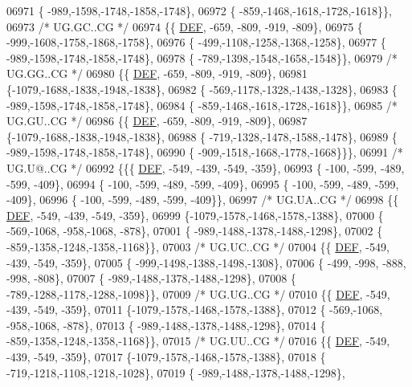 \begin{DoxyCode}
06971 \{ -989,-1598,-1748,-1858,-1748\},
06972 \{ -859,-1468,-1618,-1728,-1618\}\},
06973 \textcolor{comment}{/* UG.GC..CG */}
06974 \{\{  \mbox{\hyperlink{1_88_84__epars_8h_a397419fc12b37ed479c8abb9d444d843}{DEF}}, -659, -809, -919, -809\},
06975 \{ -999,-1608,-1758,-1868,-1758\},
06976 \{ -499,-1108,-1258,-1368,-1258\},
06977 \{ -989,-1598,-1748,-1858,-1748\},
06978 \{ -789,-1398,-1548,-1658,-1548\}\},
06979 \textcolor{comment}{/* UG.GG..CG */}
06980 \{\{  \mbox{\hyperlink{1_88_84__epars_8h_a397419fc12b37ed479c8abb9d444d843}{DEF}}, -659, -809, -919, -809\},
06981 \{-1079,-1688,-1838,-1948,-1838\},
06982 \{ -569,-1178,-1328,-1438,-1328\},
06983 \{ -989,-1598,-1748,-1858,-1748\},
06984 \{ -859,-1468,-1618,-1728,-1618\}\},
06985 \textcolor{comment}{/* UG.GU..CG */}
06986 \{\{  \mbox{\hyperlink{1_88_84__epars_8h_a397419fc12b37ed479c8abb9d444d843}{DEF}}, -659, -809, -919, -809\},
06987 \{-1079,-1688,-1838,-1948,-1838\},
06988 \{ -719,-1328,-1478,-1588,-1478\},
06989 \{ -989,-1598,-1748,-1858,-1748\},
06990 \{ -909,-1518,-1668,-1778,-1668\}\}\},
06991 \textcolor{comment}{/* UG.U@..CG */}
06992 \{\{\{  \mbox{\hyperlink{1_88_84__epars_8h_a397419fc12b37ed479c8abb9d444d843}{DEF}}, -549, -439, -549, -359\},
06993 \{ -100, -599, -489, -599, -409\},
06994 \{ -100, -599, -489, -599, -409\},
06995 \{ -100, -599, -489, -599, -409\},
06996 \{ -100, -599, -489, -599, -409\}\},
06997 \textcolor{comment}{/* UG.UA..CG */}
06998 \{\{  \mbox{\hyperlink{1_88_84__epars_8h_a397419fc12b37ed479c8abb9d444d843}{DEF}}, -549, -439, -549, -359\},
06999 \{-1079,-1578,-1468,-1578,-1388\},
07000 \{ -569,-1068, -958,-1068, -878\},
07001 \{ -989,-1488,-1378,-1488,-1298\},
07002 \{ -859,-1358,-1248,-1358,-1168\}\},
07003 \textcolor{comment}{/* UG.UC..CG */}
07004 \{\{  \mbox{\hyperlink{1_88_84__epars_8h_a397419fc12b37ed479c8abb9d444d843}{DEF}}, -549, -439, -549, -359\},
07005 \{ -999,-1498,-1388,-1498,-1308\},
07006 \{ -499, -998, -888, -998, -808\},
07007 \{ -989,-1488,-1378,-1488,-1298\},
07008 \{ -789,-1288,-1178,-1288,-1098\}\},
07009 \textcolor{comment}{/* UG.UG..CG */}
07010 \{\{  \mbox{\hyperlink{1_88_84__epars_8h_a397419fc12b37ed479c8abb9d444d843}{DEF}}, -549, -439, -549, -359\},
07011 \{-1079,-1578,-1468,-1578,-1388\},
07012 \{ -569,-1068, -958,-1068, -878\},
07013 \{ -989,-1488,-1378,-1488,-1298\},
07014 \{ -859,-1358,-1248,-1358,-1168\}\},
07015 \textcolor{comment}{/* UG.UU..CG */}
07016 \{\{  \mbox{\hyperlink{1_88_84__epars_8h_a397419fc12b37ed479c8abb9d444d843}{DEF}}, -549, -439, -549, -359\},
07017 \{-1079,-1578,-1468,-1578,-1388\},
07018 \{ -719,-1218,-1108,-1218,-1028\},
07019 \{ -989,-1488,-1378,-1488,-1298\},

\end{DoxyCode}
